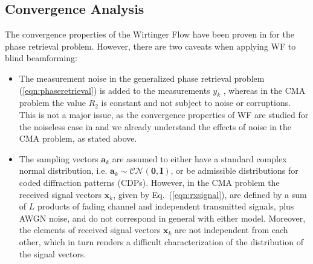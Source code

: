 \subsection{Convergence Analysis}
The convergence properties of the Wirtinger Flow have been proven in \cite{Candes2015a_phaseretrievalWF} for the phase retrieval problem. However, there are two caveats when applying WF to blind beamforming:
\begin{itemize}
	\item The measurement noise in the generalized phase retrieval problem (\ref{eqn:phaseretrieval}) is added to the measurements $y_k$ \cite{Candes2013}, whereas in the CMA problem the value $R_2$ is constant and not subject to noise or corruptions. This is not a major issue, as the convergence properties of WF are studied for the noiseless case in \cite{Candes2015a_phaseretrievalWF} and we already understand the effects of noise in the CMA problem, as stated above.
	\item The sampling vectors $\bm{a}_k$ are assumed to either have a standard complex normal distribution, i.e. $\bm{a}_k\sim\mathcal{CN}(\bm{0},\bm{I})$, or be admissible distributions for coded diffraction patterns (CDPs). However, in the CMA problem the received signal vectors $\bm{x}_k$, given by Eq.~(\ref{eqn:rxsignal}), are defined by a sum of $L$ products of fading channel and independent transmitted signals, plus AWGN noise, and do not correspond in general with either model. Moreover, the elements of received signal vectors $\bm{x}_k$ are not independent from each other, which in turn renders a difficult characterization of the distribution of the signal vectors.
\end{itemize} 

%

